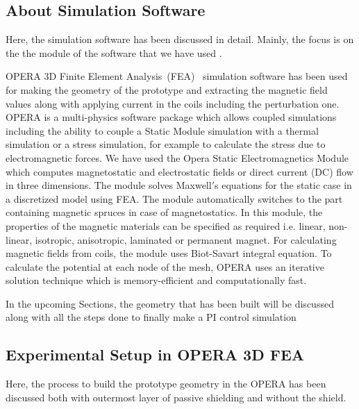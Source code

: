 \subsection{About Simulation Software}
Here, the simulation software has been discussed in detail. Mainly, the focus is on the the module of the software that we have used .

OPERA 3D Finite Element Analysis~(FEA)~\cite{opera} simulation software has been used for making the geometry of the prototype and extracting the magnetic field values along with applying current in the coils including the perturbation one. OPERA is a multi-physics software package which allows coupled simulations including the ability to couple a Static Module simulation with a thermal simulation or a stress simulation, for example to calculate the stress due to electromagnetic forces. We have used the Opera Static Electromagnetics Module which computes magnetostatic and electrostatic fields or direct current (DC) flow in three dimensions. The module solves Maxwell$'$s equations for the static case in a discretized model using FEA. The module automatically switches to the part containing magnetic spruces in case of magnetostatics. In this module, the properties of the magnetic materials can be specified as required i.e. linear, non-linear, isotropic, anisotropic, laminated or permanent magnet. For calculating magnetic fields from coils, the module uses Biot-Savart integral equation. To calculate the potential at each node of the mesh, OPERA uses an iterative solution technique which is memory-efficient and computationally fast.

In the upcoming Sections, the geometry that has been built will be discussed along with all the steps done to finally make a PI control simulation


\subsection{Experimental Setup in OPERA 3D FEA}

Here, the process to build the prototype geometry in the OPERA has been discussed both with outermost layer of passive shielding and without the shield.

